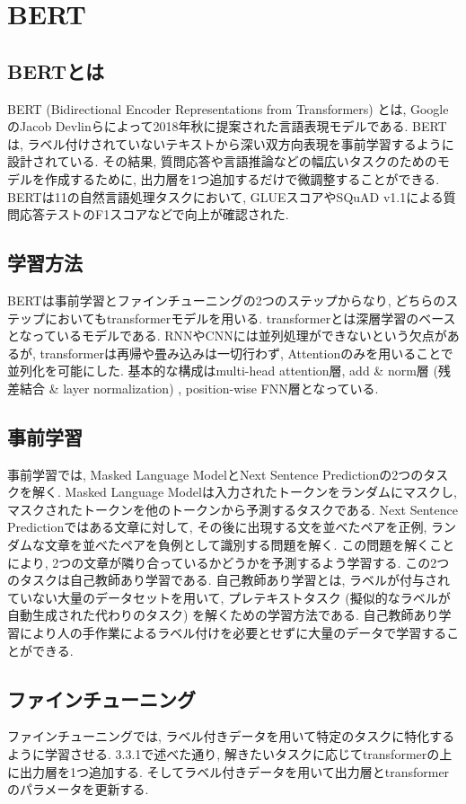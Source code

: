 \section{BERT}
\subsection{BERTとは}
BERT (Bidirectional Encoder Representations from Transformers) \cite{bert}とは, GoogleのJacob Devlinらによって2018年秋に提案された言語表現モデルである. BERTは, ラベル付けされていないテキストから深い双方向表現を事前学習するように設計されている. その結果, 質問応答や言語推論などの幅広いタスクのためのモデルを作成するために, 出力層を1つ追加するだけで微調整することができる. 
BERTは11の自然言語処理タスクにおいて, GLUEスコアやSQuAD v1.1による質問応答テストのF1スコアなどで向上が確認された. \cite{bert}

\subsection{学習方法}
BERTは事前学習とファインチューニングの2つのステップからなり, どちらのステップにおいてもtransformerモデルを用いる. transformerとは深層学習のベースとなっているモデルである. RNNやCNNには並列処理ができないという欠点があるが, transformerは再帰や畳み込みは一切行わず, Attentionのみを用いることで並列化を可能にした. 基本的な構成はmulti-head attention層, add \& norm層 (残差結合 \& layer normalization) , position-wise FNN層となっている. 

\subsection{事前学習}
事前学習では, Masked Language ModelとNext Sentence Predictionの2つのタスクを解く. Masked Language Modelは入力されたトークンをランダムにマスクし, マスクされたトークンを他のトークンから予測するタスクである. Next Sentence Predictionではある文章に対して, その後に出現する文を並べたペアを正例, ランダムな文章を並べたペアを負例として識別する問題を解く. この問題を解くことにより, 2つの文章が隣り合っているかどうかを予測するよう学習する. 
この2つのタスクは自己教師あり学習である. 自己教師あり学習とは, ラベルが付与されていない大量のデータセットを用いて, プレテキストタスク (擬似的なラベルが自動生成された代わりのタスク) を解くための学習方法である. 自己教師あり学習により人の手作業によるラベル付けを必要とせずに大量のデータで学習することができる. 

\subsection{ファインチューニング}
ファインチューニングでは, ラベル付きデータを用いて特定のタスクに特化するように学習させる. 3.3.1で述べた通り, 解きたいタスクに応じてtransformerの上に出力層を1つ追加する. そしてラベル付きデータを用いて出力層とtransformerのパラメータを更新する. 

